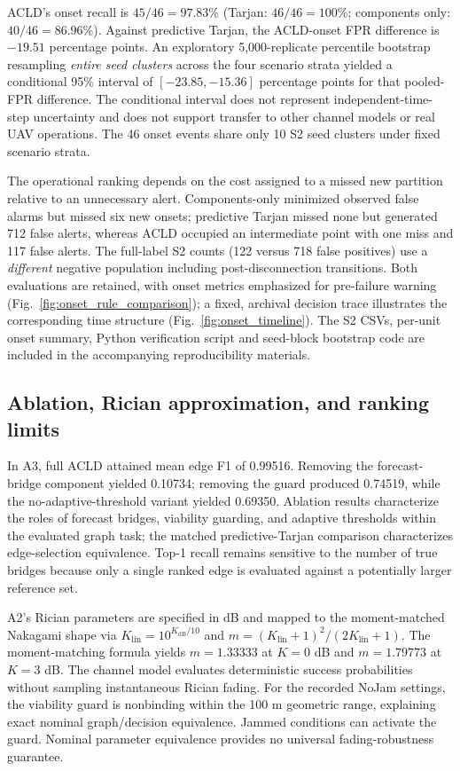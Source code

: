 \documentclass[preprint,12pt]{elsarticle}
\theoremstyle{definition}\newtheorem{definition}{Definition}
\theoremstyle{plain}\newtheorem{theorem}{Theorem}
\theoremstyle{plain}\newtheorem{lemma}{Lemma}
\theoremstyle{plain}\newtheorem{corollary}{Corollary}
\theoremstyle{plain}\newtheorem{assumption}{Assumption}
\theoremstyle{remark}\newtheorem{remark}[theorem]{Remark}
\begin{document}
ACLD's onset recall is $45/46=97.83\%$ (Tarjan: $46/46=100\%$; components only: $40/46=86.96\%$). Against predictive Tarjan, the ACLD-onset FPR difference is $-19.51$ percentage points. An exploratory 5,000-replicate percentile bootstrap resampling \emph{entire seed clusters} across the four scenario strata yielded a conditional 95\% interval of $[-23.85,-15.36]$ percentage points for that pooled-FPR difference. The conditional interval does not represent independent-time-step uncertainty and does not support transfer to other channel models or real UAV operations. The 46 onset events share only 10 S2 seed clusters under fixed scenario strata.

The operational ranking depends on the cost assigned to a missed new partition relative to an unnecessary alert. Components-only minimized observed false alarms but missed six new onsets; predictive Tarjan missed none but generated 712 false alerts, whereas ACLD occupied an intermediate point with one miss and 117 false alerts. The full-label S2 counts (122 versus 718 false positives) use a \emph{different} negative population including post-disconnection transitions. Both evaluations are retained, with onset metrics emphasized for pre-failure warning (Fig.~\ref{fig:onset_rule_comparison}); a fixed, archival decision trace illustrates the corresponding time structure (Fig.~\ref{fig:onset_timeline}). The S2 CSVs, per-unit onset summary, Python verification script and seed-block bootstrap code are included in the accompanying reproducibility materials.


\subsection{Ablation, Rician approximation, and ranking limits}
\label{subsec:robustness}
In A3, full ACLD attained mean edge F1 of 0.99516. Removing the forecast-bridge component yielded 0.10734; removing the guard produced 0.74519, while the no-adaptive-threshold variant yielded 0.69350. Ablation results characterize the roles of forecast bridges, viability guarding, and adaptive thresholds within the evaluated graph task; the matched predictive-Tarjan comparison characterizes edge-selection equivalence. Top-1 recall remains sensitive to the number of true bridges because only a single ranked edge is evaluated against a potentially larger reference set.

A2's Rician parameters are specified in dB and mapped to the moment-matched Nakagami shape via $K_{\mathrm{lin}}=10^{K_{\mathrm{dB}}/10}$ and $m=(K_{\mathrm{lin}}+1)^2/(2K_{\mathrm{lin}}+1)$. The moment-matching formula yields $m=1.33333$ at $K=0$ dB and $m=1.79773$ at $K=3$ dB. The channel model evaluates deterministic success probabilities without sampling instantaneous Rician fading. For the recorded NoJam settings, the viability guard is nonbinding within the 100 m geometric range, explaining exact nominal graph/decision equivalence. Jammed conditions can activate the guard. Nominal parameter equivalence provides no universal fading-robustness guarantee.
\end{document}
